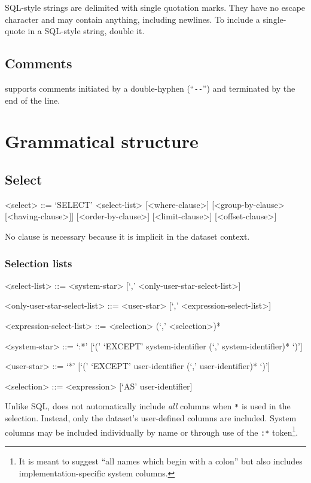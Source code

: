 \documentclass{article}
\begin{document}
SQL-style strings are delimited with single quotation marks.  They
have no escape character and may contain anything, including newlines.
To include a single-quote in a SQL-style string, double it.

\subsection{Comments}

\SoQL{} supports comments initiated by a double-hyphen
(``\lstinline|--|'') and terminated by the end of the line.

\section{Grammatical structure}

\subsection{Select}
\begin{grammar}
<select> ::= `SELECT' <select-list> [<where-clause>] [<group-by-clause> [<having-clause>]] [<order-by-clause>] [<limit-clause>] [<offset-clause>]
\end{grammar}

No  clause is necessary because it is implicit in the
dataset context.

\subsubsection{Selection lists}
\begin{grammar}
<select-list> ::= <system-star> [`,' <only-user-star-select-list>]

<only-user-star-select-list> ::= <user-star> [`,' <expression-select-list>]

<expression-select-list> ::= <selection> (`,' <selection>)*

<system-star> ::= `:*' [`(' `EXCEPT' system-identifier (`,' system-identifier)* `)']

<user-star> ::= `*' [`(' `EXCEPT' user-identifier (`,' user-identifier)* `)']

<selection> ::= <expression> [`AS' user-identifier]
\end{grammar}

Unlike SQL, \SoQL{} does not automatically include \emph{all} columns
when \lstinline|*| is used in the selection.  Instead, only the
dataset's user-defined columns are included.  System columns may be
included individually by name or through use of the \lstinline|:*|
token\footnote{It is meant to suggest ``all names which begin with a
  colon'' but also includes implementation-specific system columns.}.
\end{document}
